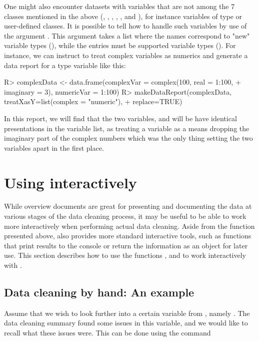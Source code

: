 \documentclass[article,shortnames]{jss}
\begin{document}
One might also encounter datasets with variables that are not among the 7 classes mentioned in the above (, , , , ,  and ), for instance variables of type  or user-defined classes. It is possible to tell  how to handle such variables by use of the argument . This argument takes a list where the names correspond to "new" variable types (), while the entries must be supported variable types (). For instance, we can instruct  to treat complex variables as numerics and generate a data report for a type  variable like this:

\begin{Schunk}
\begin{Sinput}
R> complexData <- data.frame(complexVar = complex(100, real = 1:100, 
+    imaginary = 3), numericVar = 1:100)
R> makeDataReport(complexData, treatXasY=list(complex = "numeric"), 
+    replace=TRUE)
\end{Sinput}
\end{Schunk}

In this report, we will find that the two variables,  and  will be have identical presentations in the variable list, as treating a  variable as a  means dropping the imaginary part of the complex numbers which was the only thing setting the two variables apart in the first place.  


\section[Using dataMaid interactively]{Using  interactively}
\label{sec:interactiveCleanR}

While overview documents are great for presenting and documenting the data at various stages 
of the data cleaning process, it may be useful to be able to work more
interactively when performing actual data cleaning. Aside from
the  function presented above,  also
provides more standard  interactive tools, such as
functions that print results to the console or return the information
as an object for later use. This section describes how to use the
functions ,  and  to
work interactively with .

\subsection{Data cleaning by hand: An example}
Assume that we wish to look further into a certain variable from
, namely . The data cleaning summary found some
issues in this variable, and we would like to recall what these issues
were. This can be done using the  command
\end{document}
